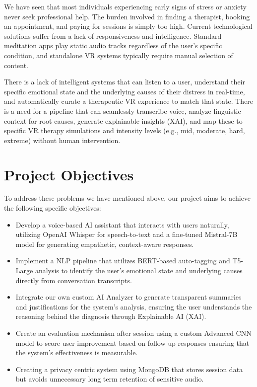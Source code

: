 We have seen that most individuals experiencing early signs of stress or anxiety never seek professional help. The burden involved in finding a therapist, booking an appointment, and paying for sessions is simply too high. Current technological solutions suffer from a lack of responsiveness and intelligence. Standard meditation apps play static audio tracks regardless of the user's specific condition, and standalone VR systems typically require manual selection of content.

There is a lack of intelligent systems that can listen to a user, understand their specific emotional state and the underlying causes of their distress in real-time, and automatically curate a therapeutic VR experience to match that state. There is a need for a pipeline that can seamlessly transcribe voice, analyze linguistic context for root causes, generate explainable insights (XAI), and map these to specific VR therapy simulations and intensity levels (e.g., mid, moderate, hard, extreme) without human intervention.

\section{Project Objectives}

To address these problems we have mentioned above, our project aims to achieve the following specific
objectives:

\begin{itemize}
    \item Develop a voice-based AI assistant that interacts with users naturally, utilizing OpenAI Whisper for speech-to-text and a fine-tuned Mistral-7B model for generating empathetic, context-aware responses.
    \item Implement a NLP pipeline that utilizes BERT-based auto-tagging and T5-Large analysis to identify the user's emotional state and underlying causes directly from conversation transcripts.
    \item Integrate our own custom AI Analyzer to generate transparent summaries and justifications for the system's analysis, ensuring the user understands the reasoning behind the diagnosis through Explainable AI (XAI).
    \item Create an evaluation mechanism after session using a custom Advanced CNN model to score user improvement based on follow up responses ensuring that the system's effectiveness is measurable.
    \item Creating a privacy centric system using MongoDB that stores session data but avoids unnecessary long term retention of sensitive audio.
\end{itemize}

